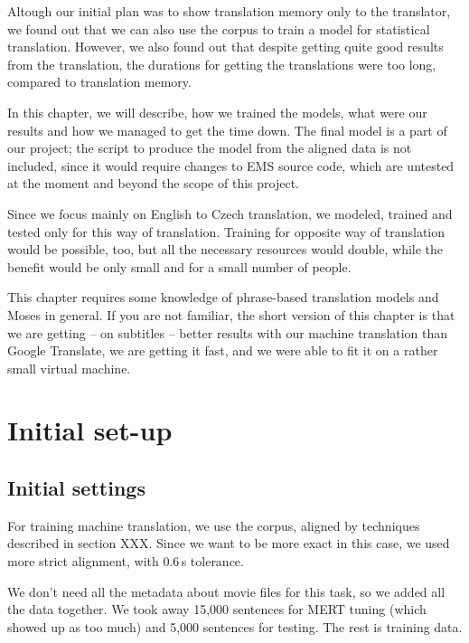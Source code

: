 \label{chap:moses}


Altough our initial plan was to show translation memory only to the translator, we found out that we can also use the corpus to train a model for statistical translation. However, we also found out that despite getting quite good results from the translation, the durations for getting the translations were too long, compared to translation memory.

In this chapter, we will describe, how we trained the models, what were our results and how we managed to get the time down. The final model is a part of our project; the script to produce the model from the aligned data is not included, since it would require changes to EMS source code, which are untested at the moment and beyond the scope of this project.

Since we focus mainly on English to Czech translation, we modeled, trained and tested only for this way of translation. Training for opposite way of translation would be possible, too, but all the necessary resources would double, while the benefit would be only small and for a small number of people.

This chapter requires some knowledge of phrase-based translation models and Moses in general. If you are not familiar, the short version of this chapter is that we are getting -- on subtitles -- better results with our machine translation than Google Translate, we are getting it fast, and we were able to fit it on a rather small virtual machine.


\section{Initial set-up}
\subsection{Initial settings}
For training machine translation, we use the corpus, aligned by techniques described in section XXX. Since we want to be more exact in this case, we used more strict alignment, with 0.6\,s tolerance.

We don't need all the metadata about movie files for this task, so we added all the data together. We took away 15,000 sentences for MERT tuning (which showed up as too much) and 5,000 sentences for testing. The rest is training data.

